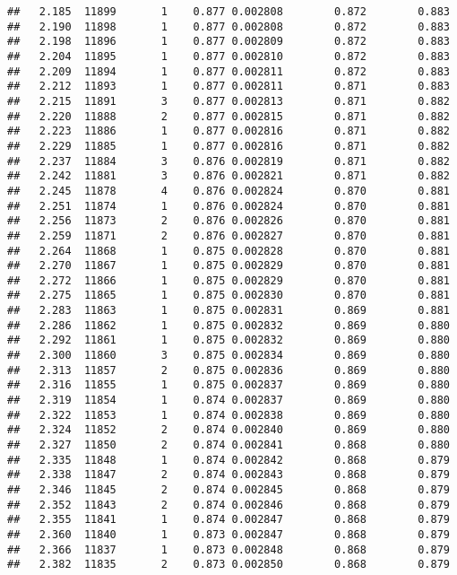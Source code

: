 \documentclass[
]{book}
\begin{document}
\begin{verbatim}
##   2.185  11899       1    0.877 0.002808        0.872        0.883
##   2.190  11898       1    0.877 0.002808        0.872        0.883
##   2.198  11896       1    0.877 0.002809        0.872        0.883
##   2.204  11895       1    0.877 0.002810        0.872        0.883
##   2.209  11894       1    0.877 0.002811        0.872        0.883
##   2.212  11893       1    0.877 0.002811        0.871        0.883
##   2.215  11891       3    0.877 0.002813        0.871        0.882
##   2.220  11888       2    0.877 0.002815        0.871        0.882
##   2.223  11886       1    0.877 0.002816        0.871        0.882
##   2.229  11885       1    0.877 0.002816        0.871        0.882
##   2.237  11884       3    0.876 0.002819        0.871        0.882
##   2.242  11881       3    0.876 0.002821        0.871        0.882
##   2.245  11878       4    0.876 0.002824        0.870        0.881
##   2.251  11874       1    0.876 0.002824        0.870        0.881
##   2.256  11873       2    0.876 0.002826        0.870        0.881
##   2.259  11871       2    0.876 0.002827        0.870        0.881
##   2.264  11868       1    0.875 0.002828        0.870        0.881
##   2.270  11867       1    0.875 0.002829        0.870        0.881
##   2.272  11866       1    0.875 0.002829        0.870        0.881
##   2.275  11865       1    0.875 0.002830        0.870        0.881
##   2.283  11863       1    0.875 0.002831        0.869        0.881
##   2.286  11862       1    0.875 0.002832        0.869        0.880
##   2.292  11861       1    0.875 0.002832        0.869        0.880
##   2.300  11860       3    0.875 0.002834        0.869        0.880
##   2.313  11857       2    0.875 0.002836        0.869        0.880
##   2.316  11855       1    0.875 0.002837        0.869        0.880
##   2.319  11854       1    0.874 0.002837        0.869        0.880
##   2.322  11853       1    0.874 0.002838        0.869        0.880
##   2.324  11852       2    0.874 0.002840        0.869        0.880
##   2.327  11850       2    0.874 0.002841        0.868        0.880
##   2.335  11848       1    0.874 0.002842        0.868        0.879
##   2.338  11847       2    0.874 0.002843        0.868        0.879
##   2.346  11845       2    0.874 0.002845        0.868        0.879
##   2.352  11843       2    0.874 0.002846        0.868        0.879
##   2.355  11841       1    0.874 0.002847        0.868        0.879
##   2.360  11840       1    0.873 0.002847        0.868        0.879
##   2.366  11837       1    0.873 0.002848        0.868        0.879
##   2.382  11835       2    0.873 0.002850        0.868        0.879

\end{verbatim}
\end{document}
